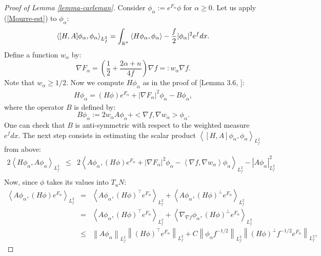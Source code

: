 \documentclass[a4paper,11pt,reqno]{amsart}
\def\R{\mathop{\rm \mathbb{R}}\nolimits}
\begin{document}
\begin{proof}[Proof of Lemma \ref{lemma-carleman}]
Consider $\phi_{\alpha}:=e^{F_{\alpha}}\phi$ for $\alpha\geq 0$. Let us apply (\ref{Mourre-est}) to $\phi_{\alpha}$:
\begin{eqnarray}
\left<[H,A]\phi_{\alpha},\phi_{\alpha}\right>_{L^2_f}=\int_{\R^n}\left<H\phi_{\alpha},\phi_{\alpha}\right>-\frac{f}{2}|\phi_{\alpha}|^2e^fdx.\label{equ-mourre}
\end{eqnarray}
Define a function $w_{\alpha}$ by: $$\nabla F_{\alpha}=\left(\frac{1}{2}+\frac{2\alpha+n}{4f}\right)\nabla f=:w_{\alpha}\nabla f.$$ Note that $w_{\alpha}\geq 1/2$. Now we compute $H\phi_{\alpha}$ as in the proof of [Lemma $3.6$, \cite{Uni-Con-Egs-Der}]:
\begin{eqnarray}
H\phi_{\alpha}=(H\phi)e^{F_{\alpha}}+|\nabla F_{\alpha}|^2\phi_{\alpha}-B\phi_{\alpha},\label{H-phi-B}
\end{eqnarray}
where the operator $B$ is defined by:$$B\phi_{\alpha}:=2w_{\alpha}A\phi_{\alpha}+<\nabla f,\nabla w_{\alpha}>\phi_{\alpha}. $$One can check that $B$ is anti-symmetric with respect to the weighted measure $e^fdx$. The next step consists in estimating the scalar product $\left<[H,A]\phi_{\alpha},\phi_{\alpha}\right>_{L^2_f}$ from above:
\begin{eqnarray*}
2\left<H\phi_{\alpha},A\phi_{\alpha}\right>_{L^2_f}&\leq& 2\left<A\phi_{\alpha},(H\phi)e^{F_{\alpha}}+|\nabla F_{\alpha}|^2\phi_{\alpha}-\left<\nabla f,\nabla w_{\alpha}\right>\phi_{\alpha}\right>_{L^2_f}-|A\phi_{\alpha}|^2_{L^2_f}\\
\end{eqnarray*}
Now, since $\phi$ takes its values into $T_uN$:
\begin{eqnarray*}
\left<A\phi_{\alpha},(H\phi)e^{F_{\alpha}}\right>_{L^2_f}&=&\left<A\phi_{\alpha},(H\phi)^{\top}e^{F_{\alpha}}\right>_{L^2_f}+\left<A\phi_{\alpha},(H\phi)^{\perp}e^{F_{\alpha}}\right>_{L^2_f}\\
&=&\left<A\phi_{\alpha},(H\phi)^{\top}e^{F_{\alpha}}\right>_{L^2_f}+\left<\nabla_{\nabla f}\phi_{\alpha},(H\phi)^{\perp}e^{F_{\alpha}}\right>_{L^2_f}\\
&\leq&\left\|A\phi_{\alpha}\right\|_{L^2_f}\left\|(H\phi)^{\top}e^{F_{\alpha}}\right\|_{L^2_f}+C\left\|\phi_{\alpha}f^{-1/2}\right\|_{L^2_f}\left\|(H\phi)^{\perp}f^{-1/2}e^{F_{\alpha}}\right\|_{L^2_f},

\end{eqnarray*}
\end{proof}
\end{document}
